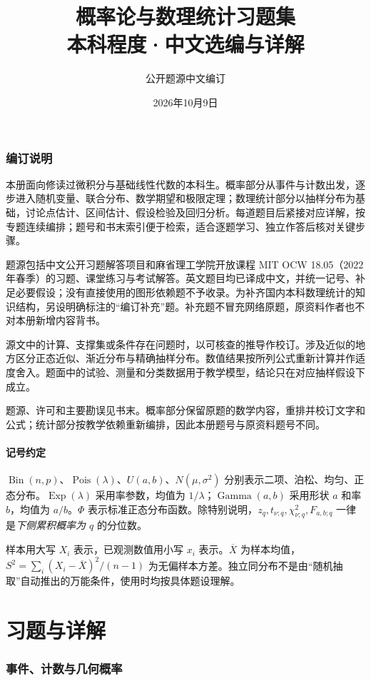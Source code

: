 \documentclass[UTF8,12pt,a4paper,fontset=fandol]{ctexart}
\title{概率论与数理统计习题集\\\large 本科程度·中文选编与详解}
\author{公开题源中文编订}
\date{2026年10月9日}
\begin{document}
\maketitle
\thispagestyle{empty}
\clearpage
\section*{编订说明}
本册面向修读过微积分与基础线性代数的本科生。概率部分从事件与计数出发，逐步进入随机变量、联合分布、数学期望和极限定理；数理统计部分以抽样分布为基础，讨论点估计、区间估计、假设检验及回归分析。每道题目后紧接对应详解，按专题连续编排；题号和书末索引便于检索，适合逐题学习、独立作答后核对关键步骤。

题源包括中文公开习题解答项目和麻省理工学院开放课程 MIT OCW 18.05（2022 年春季）的习题、课堂练习与考试解答。英文题目均已译成中文，并统一记号、补足必要假设；没有直接使用的图形依赖题不予收录。为补齐国内本科数理统计的知识结构，另设明确标注的“编订补充”题。补充题不冒充网络原题，原资料作者也不对本册新增内容背书。

源文中的计算、支撑集或条件存在问题时，以可核查的推导作校订。涉及近似的地方区分正态近似、渐近分布与精确抽样分布。数值结果按所列公式重新计算并作适度舍入。题面中的试验、测量和分类数据用于教学模型，结论只在对应抽样假设下成立。

题源、许可和主要勘误见书末。概率部分保留原题的数学内容，重排并校订文字和公式；统计部分按教学依赖重新编排，因此本册题号与原资料题号不同。
\subsection*{记号约定}
$\operatorname{Bin}(n,p)$、$\operatorname{Pois}(\lambda)$、$U(a,b)$、$N(\mu,\sigma^2)$ 分别表示二项、泊松、均匀、正态分布。$\operatorname{Exp}(\lambda)$ 采用率参数，均值为 $1/\lambda$；$\operatorname{Gamma}(a,b)$ 采用形状 $a$ 和率 $b$，均值为 $a/b$。$\Phi$ 表示标准正态分布函数。除特别说明，$z_q,t_{\nu;q},\chi^2_{\nu;q},F_{a,b;q}$ 一律是\textit{下侧累积概率为 $q$} 的分位数。

样本用大写 $X_i$ 表示，已观测数值用小写 $x_i$ 表示。$\overline X$ 为样本均值，$S^2=\sum_i(X_i-\overline X)^2/(n-1)$ 为无偏样本方差。独立同分布不是由“随机抽取”自动推出的万能条件，使用时均按具体题设理解。
\clearpage
\tableofcontents
\clearpage
\part{习题与详解}


\clearpage\section{事件、计数与几何概率}
\end{document}
